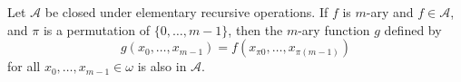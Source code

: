 Let $\mathcal{A}$ be closed under elementary recursive operations. If $f$ is $m$-ary and $f\in\mathcal{A}$, and $\pi$ is a permutation of $\{0,\ldots,m-1\}$, then the $m$-ary function $g$ defined by
$$g(x_0,\ldots,x_{m-1}) = f(x_{\pi 0},\ldots,x_{\pi(m-1)})$$
for all $x_0,\ldots,x_{m-1}\in\omega$ is also in $\mathcal{A}$.
